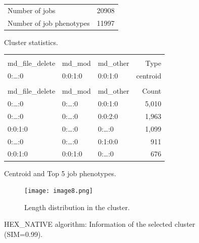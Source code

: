 \documentclass{jhps}
\begin{document}
\begin{figure}
	\begin{subtable}{\textwidth}
		\centering
		\begin{tabular}{ll}
			Number of jobs & 20908 \\
			Number of job phenotypes & 11997 \\
		\end{tabular}
		\caption{Cluster statistics.}
		\label{cluster:hex_native:stats}
	\end{subtable}
	\medskip
	\begin{subtable}{\textwidth}
		\centering
		\begin{tiny}
			\begin{tabular}{lll|r}
				\rowcolor{tblhead}
				\multicolumn{3}{l|}{Hexadecimal coding} &            \\
				\rowcolor{tblhead}
				md\_file\_delete     &  md\_mod   & md\_other & Type     \\
				\hline
				0:\dots:0            &  0:0:1:0   & 0:0:1:0   & centroid \\
				\multicolumn{4}{l}{} \\
				\rowcolor{tblhead}
				md\_file\_delete     &  md\_mod   & md\_other & Count    \\
				\hline
				0:\dots:0            &  0:\dots:0 & 0:0:1:0   & 5,010    \\
				0:\dots:0            &  0:\dots:0 & 0:0:2:0   & 1,963    \\
				0:0:1:0              &  0:\dots:0 & 0:\dots:0 & 1,099    \\
				0:\dots:0            &  0:\dots:0 & 0:1:0:0   & 911      \\
				0:0:1:0              &  0:0:1:0   & 0:\dots:0 & 676      \\
			\end{tabular}
		\end{tiny}
		\caption{Centroid and Top 5 job phenotypes.}
		\label{cluster:hex_native:top_jobs}
	\end{subtable}
	\medskip
	\begin{subfigure}{\textwidth}
		\centering
		\texttt{[image: image8.png]}
		\caption{Length distribution in the cluster.}
		\label{cluster:hex_native:length}
	\end{subfigure}
	\caption{HEX\_NATIVE algorithm: Information of the selected cluster (SIM=0.99).}
	\label{cluster:hex_native}
\end{figure}

\FloatBarrier
\end{document}
